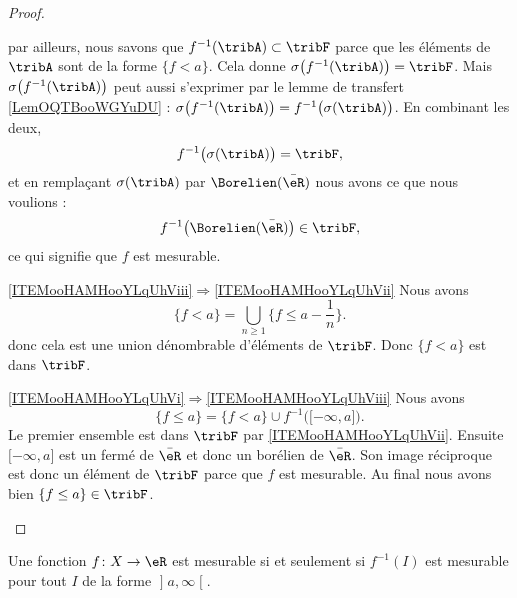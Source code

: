 \begin{proof}
\begin{subproof}
        par ailleurs, nous savons que \( f^{-1}(\tribA)\subset\tribF\) parce que les éléments de \( \tribA\) sont de la forme \( \{ f<a \}\). Cela donne \( \sigma\big( f^{-1}(\tribA) \big)=\tribF\). Mais \( \sigma\big( f^{-1}(\tribA) \big)\) peut aussi s'exprimer par le lemme de transfert \ref{LemOQTBooWGYuDU} : \( \sigma\big( f^{-1}(\tribA) \big)=f^{-1}\big( \sigma(\tribA) \big)\). En combinant les deux,
        \begin{equation}
            f^{-1}\big( \sigma(\tribA) \big)=\tribF,
        \end{equation}
        et en remplaçant \( \sigma(\tribA)\) par \( \Borelien(\bar \eR)\) nous avons ce que nous voulions :
        \begin{equation}
            f^{-1}\big( \Borelien(\bar\eR) \big)\in\tribF,
        \end{equation}
        ce qui signifie que \( f\) est mesurable.
        \item[\ref{ITEMooHAMHooYLqUhViii}\( \Rightarrow\)\ref{ITEMooHAMHooYLqUhVii}]
            Nous avons
            \begin{equation}
                \{ f<a \}=\bigcup_{n\geq 1}\{ f\leq a-\frac{1}{ n } \}.
            \end{equation}
            donc cela est une union dénombrable d'éléments de \( \tribF\). Donc \( \{ f<a \}\) est dans \( \tribF\).
        \item[\ref{ITEMooHAMHooYLqUhVi}\( \Rightarrow\)\ref{ITEMooHAMHooYLqUhViii}]
            Nous avons
            \begin{equation}
                \{ f\leq a \}=\{ f<a \}\cup f^{-1}\big( \mathopen[ -\infty , a \mathclose] \big).
            \end{equation}
            Le premier ensemble est dans \( \tribF\) par \ref{ITEMooHAMHooYLqUhVii}. Ensuite \( \mathopen[ -\infty , a \mathclose]\) est un fermé de \( \bar \eR\) et donc un borélien de \( \bar \eR\). Son image réciproque est donc un élément de \( \tribF\) parce que \( f\) est mesurable. Au final nous avons bien \( \{ f\leq a \}\in\tribF\).
    \end{subproof}
\end{proof}

\begin{lemma}   \label{LemFOlheqw}
    Une fonction \( f\colon X\to \eR\) est mesurable si et seulement si \( f^{-1}(I)\) est mesurable pour tout \( I\) de la forme \( \mathopen] a , \infty \mathclose[\).
\end{lemma}

